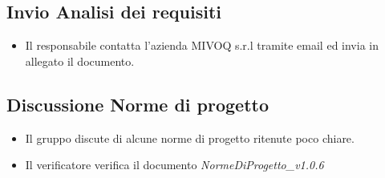 \documentclass[11pt,a4paper]{article}
\begin{document}
		\subsection{Invio Analisi dei requisiti}
	\begin{itemize}
		\item Il responsabile contatta l'azienda MIVOQ s.r.l tramite email ed invia in allegato il documento.
	\end{itemize}
	\subsection{Discussione Norme di progetto}
	\begin{itemize}
		\item Il gruppo discute di alcune norme di progetto ritenute poco chiare.
		\item Il verificatore  verifica il documento \textit{NormeDiProgetto\_v1.0.6}
	\end{itemize}
	
\end{document}
